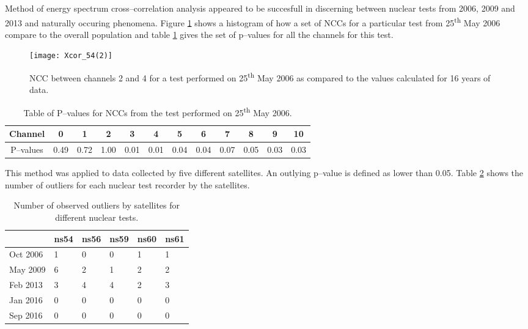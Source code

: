 \documentclass[twocolumn,prl,nobalancelastpage,aps,10pt,floatfix]{revtex4-1}
\begin{document}
Method of energy spectrum cross--correlation analysis appeared to be succesfull in discerning between nuclear tests from 2006, 2009 and 2013 and naturally occuring phenomena. Figure \ref{Xcor} shows a histogram of how a set of NCCs for a particular test from 25\textsuperscript{th} May 2006 compare to the overall population and table \ref{pv} gives the set of p--values for all the channels for this test.
\begin{figure}
	\texttt{[image: Xcor\_54(2)]} 
	\caption{NCC between channels 2 and 4 for a test performed on 25\textsuperscript{th} May 2006 as compared to the values calculated for 16 years of data.}\label{Xcor} 
\end{figure}
 \begin{table}
 	\begin{tabular}{|c|c|c|c|c|c|c|c|c|c|c|c|}
 		\hline
 		Channel & 0 & 1 & 2 & 3 & 4 & 5 & 6 & 7 & 8 & 9 & 10  \\
 		\hline
 		P--values & 0.49 & 0.72 & 1.00 & 0.01 & 0.01 & 0.04 & 0.04 & 0.07 & 0.05 & 0.03 & 0.03\\
 		\hline	
 	\end{tabular}
 \caption{Table of P--values for NCCs from the test performed on 25\textsuperscript{th} May 2006.}\label{pv} 
 \end{table}

This method was applied to data collected by five different satellites. An outlying p--value is defined as lower than 0.05. Table \ref{Xsat} shows the number of outliers for each nuclear test recorder by the satellites.

\begin{table}[]
	\centering
	\caption{Number of observed outliers by satellites for different nuclear tests.}\label{Xsat}
	\begin{tabular}{l|l|l|l|l|l|}
		\cline{2-6}
		& ns54 & ns56 & ns59 & ns60 & ns61  \\ \hline
		\multicolumn{1}{|l|}{Oct 2006} & 1 & 0 & 0 & 1 & 1 \\ \hline
		\multicolumn{1}{|l|}{May 2009} & 6 & 2 & 1 & 2 & 2 \\ \hline
		\multicolumn{1}{|l|}{Feb 2013} & 3 & 4 & 4 & 2 & 3 \\ \hline
		\multicolumn{1}{|l|}{Jan 2016} & 0 & 0 & 0 & 0 & 0 \\ \hline
		\multicolumn{1}{|l|}{Sep 2016} & 0 & 0 & 0 & 0 & 0 \\ \hline
	\end{tabular}
\end{table}
\end{document}
